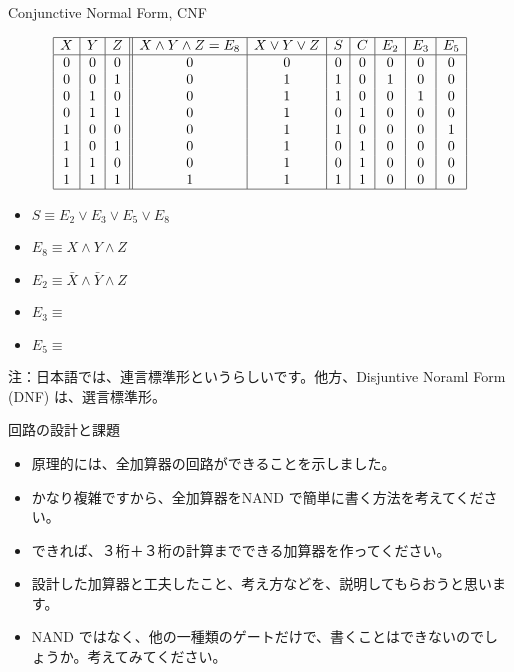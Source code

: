 \documentclass[10pt, dvipdfmx]{beamer}
\begin{document}
\begin{frame}{Conjunctive Normal Form, CNF}

\[ 
\begin{array}{|c|c|c||c|c|c|c|c|c|c|} \hline 
X  & Y  & Z  & X \land Y \land Z = E_8  & X \lor Y \lor Z  & S  & C  & E_2  & E_3  & E_5 \\ \hline 
0  & 0  & 0  & 0  & 0  & 0  & 0  & 0  & 0  & 0\\ 
0  & 0  & 1  & 0  & 1  & 1  & 0  & 1  & 0  & 0\\ 
0  & 1  & 0  & 0  & 1  & 1  & 0  & 0  & 1  & 0\\ 
0  & 1  & 1  & 0  & 1  & 0  & 1  & 0  & 0  & 0\\ 
1  & 0  & 0  & 0  & 1  & 1  & 0  & 0  & 0  & 1 \\ 
1  & 0  & 1  & 0  & 1  & 0  & 1  & 0  & 0  & 0\\ 
1  & 1  & 0  & 0  & 1  & 0  & 1  & 0  & 0  & 0\\ 
1  & 1  & 1  & 1  & 1  & 1  & 1  & 0  & 0  & 0\\ \hline 
\end{array} 
\]

\begin{itemize}
\item \(S \equiv E_2 \lor E_3 \lor E_5 \lor E_8\)
\item \(E_8 \equiv X \land Y \land Z\)
\item \(E_2 \equiv \bar{X} \land \bar{Y} \land Z\)
\item \(E_3 \equiv\)
\item \(E_5 \equiv\)
\end{itemize}
注：日本語では、連言標準形というらしいです。他方、Disjuntive Noraml Form (DNF) は、選言標準形。\par
\end{frame}

\begin{frame}{回路の設計と課題}

\begin{itemize}
\item 原理的には、全加算器の回路ができることを示しました。

\medskip
\item かなり複雑ですから、全加算器をNAND で簡単に書く方法を考えてください。

\medskip
\item できれば、３桁＋３桁の計算までできる加算器を作ってください。

\medskip
\item 設計した加算器と工夫したこと、考え方などを、説明してもらおうと思います。  

\medskip 

\item NAND ではなく、他の一種類のゲートだけで、書くことはできないのでしょうか。考えてみてください。
\end{itemize}
\end{frame}
\end{document}
